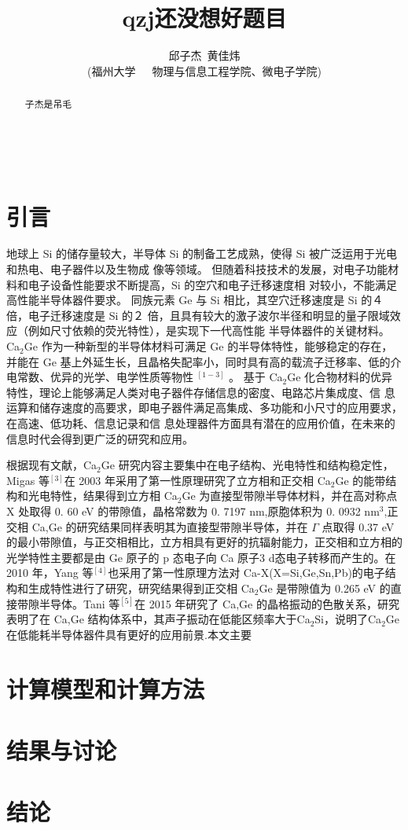 \documentclass[12pt,a4paper]{article}%
\title{\fontsize{18pt}{27pt}\selectfont%
	{\heiti%
	qzj还没想好题目}}%
\author{\fontsize{12pt}{18pt}\selectfont%
	{\fangsong%
		邱子杰~黄佳炜}\\%
	\fontsize{10.5pt}{15.75pt}\selectfont%
	{\fangsong%
		(福州大学~~~物理与信息工程学院、微电子学院)}}%
\date{}%
\begin{document}
	\maketitle%
	\lhead{}%
	\chead{}%
	\rhead{}%
	\lfoot{}%
	\cfoot{\thepage}%
	\rfoot{}%
	\begin{abstract}
		\fangsong 子杰是吊毛
	\end{abstract}
	
	\begin{adjustwidth}{1.06cm}{1.06cm}
		\fontsize{10.5pt}{15.75pt}\\
	\end{adjustwidth}
	\section{引言}
	地球上 Si 的储存量较大，半导体 Si 的制备工艺成熟，使得 Si 被广泛运用于光电和热电、电子器件以及生物成
	像等领域。 但随着科技技术的发展，对电子功能材料和电子设备性能要求不断提高，Si 的空穴和电子迁移速度相
	对较小，不能满足高性能半导体器件要求。 同族元素 Ge 与 Si 相比，其空穴迁移速度是 Si 的４ 倍，电子迁移速度是
	Si 的２ 倍，且具有较大的激子波尔半径和明显的量子限域效应（例如尺寸依赖的荧光特性），是实现下一代高性能
	半导体器件的关键材料。Ca$_{2}$Ge 作为一种新型的半导体材料可满足 Ge 的半导体特性，能够稳定的存在，并能在
	Ge 基上外延生长，且晶格失配率小，同时具有高的载流子迁移率、低的介电常数、优异的光学、电学性质等物性
	$^{[1-3]}$
	。 基于 Ca$_{2}$Ge 化合物材料的优异特性，理论上能够满足人类对电子器件存储信息的密度、电路芯片集成度、信
	息运算和储存速度的高要求，即电子器件满足高集成、多功能和小尺寸的应用要求，在高速、低功耗、信息记录和信
	息处理器件方面具有潜在的应用价值，在未来的信息时代会得到更广泛的研究和应用。
	
	根据现有文献，Ca$_{2}$Ge 研究内容主要集中在电子结构、光电特性和结构稳定性，Migas 等$^{[3]}$在 2003 年采用了第一性原理研究了立方相和正交相 Ca$_2$Ge 的能带结构和光电特性，结果得到立方相 Ca$_2$Ge 为直接型带隙半导体材料，并在高对称点 X 处取得 0. 60 eV 的带隙值，晶格常数为 0. 7197 nm,原胞体积为 0. 0932 nm$^{3}$,正交相 Ca,Ge 的研究结果同样表明其为直接型带隙半导体，并在 $\Gamma$ 点取得 0.37 eV 的最小带隙值，与正交相相比，立方相具有更好的抗辐射能力，正交相和立方相的光学特性主要都是由 Ge 原子的 p 态电子向 Ca 原子3 d态电子转移而产生的。在 2010 年，Yang 等$^{[4]}$也采用了第一性原理方法对 Ca-X(X=Si,Ge,Sn,Pb)的电子结构和生成特性进行了研究，研究结果得到正交相 Ca$_{2}$Ge 是带隙值为 0.265 eV 的直接带隙半导体。Tani 等$^{[5]}$在 2015 年研究了 Ca,Ge 的晶格振动的色散关系，研究表明了在 Ca,Ge 结构体系中，其声子振动在低能区频率大于Ca$_{2}$Si，说明了Ca$_{2}$Ge在低能耗半导体器件具有更好的应用前景.本文主要
	\section{计算模型和计算方法}
	\section{结果与讨论}
	\section{结论}
	

	
\end{document}
